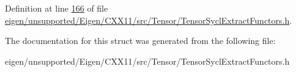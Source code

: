 Definition at line \hyperlink{eigen_2unsupported_2_eigen_2_c_x_x11_2src_2_tensor_2_tensor_sycl_extract_functors_8h_source_l00166}{166} of file \hyperlink{eigen_2unsupported_2_eigen_2_c_x_x11_2src_2_tensor_2_tensor_sycl_extract_functors_8h_source}{eigen/unsupported/\+Eigen/\+C\+X\+X11/src/\+Tensor/\+Tensor\+Sycl\+Extract\+Functors.\+h}.



The documentation for this struct was generated from the following file\+:\begin{DoxyCompactItemize}
\item 
eigen/unsupported/\+Eigen/\+C\+X\+X11/src/\+Tensor/\+Tensor\+Sycl\+Extract\+Functors.\+h\end{DoxyCompactItemize}

